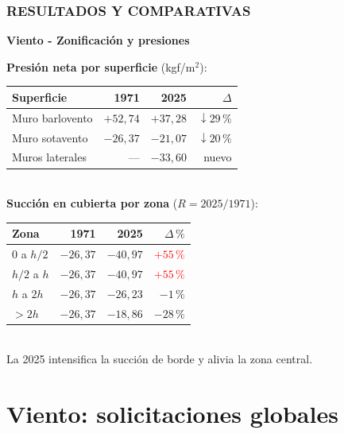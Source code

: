 \documentclass[11.5pt,aspectratio=169,handout]{beamer}
\newcommand{\ctitle}[1]{\frametitle{#1}}
\begin{document}
\begin{frame}
\ctitle{RESULTADOS Y COMPARATIVAS}
\vspace{-5mm}
\begin{center}
  \textcolor{azulUSACH}{\textbf{Viento - Zonificación y presiones}}
\end{center}
\vspace{1mm}
\begin{center}
{\small\textbf{Presión neta por superficie} (kgf/m$^2$):}\\[1mm]
{\scriptsize
\begin{tabular}{@{}lrrr@{}}
  \toprule
  Superficie & 1971 & 2025 & $\Delta$ \\
  \midrule
  Muro barlovento & $+52{,}74$ & $+37{,}28$ & $\downarrow 29\,\text{\%}$ \\
  Muro sotavento  & $-26{,}37$ & $-21{,}07$ & $\downarrow 20\,\text{\%}$ \\
  Muros laterales & ---        & $-33{,}60$ & nuevo \\
  \bottomrule
\end{tabular}}\\[2mm]
{\small\textbf{Succión en cubierta por zona} ($R = 2025/1971$):}\\[1mm]
{\scriptsize
\begin{tabular}{@{}lrrr@{}}
  \toprule
  Zona & 1971 & 2025 & $\Delta\,\text{\%}$ \\
  \midrule
  0 a $h/2$    & $-26{,}37$ & $-40{,}97$ & \textcolor{red}{\textbf{$+55\,\text{\%}$}} \\
  $h/2$ a $h$  & $-26{,}37$ & $-40{,}97$ & \textcolor{red}{\textbf{$+55\,\text{\%}$}} \\
  $h$ a $2h$   & $-26{,}37$ & $-26{,}23$ & $-1\,\text{\%}$ \\
  $> 2h$       & $-26{,}37$ & $-18{,}86$ & \textcolor{verdeBox}{$-28\,\text{\%}$} \\
  \bottomrule
\end{tabular}}\\[1.5mm]
{\small La 2025 \alert{intensifica} la succión de borde y \alert{alivia} la zona central.}
\end{center}
\end{frame}

\section{Viento: solicitaciones globales}
\end{document}
